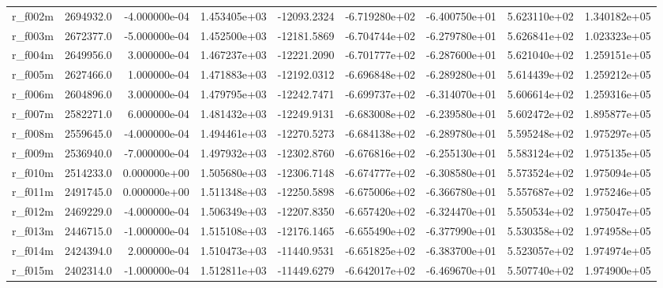 \documentclass[12pt]{article}
\begin{document}
\begin{landscape}
\begin{longtable}{|l|r|r|r|r|r|r|r|r|}
r\_f002m                 &  2694932.0 & -4.000000e-04 &  1.453405e+03 & -12093.2324 & -6.719280e+02 & -6.400750e+01 &  5.623110e+02 &  1.340182e+05 \\
r\_f003m                 &  2672377.0 & -5.000000e-04 &  1.452500e+03 & -12181.5869 & -6.704744e+02 & -6.279780e+01 &  5.626841e+02 &  1.023323e+05 \\
r\_f004m                 &  2649956.0 &  3.000000e-04 &  1.467237e+03 & -12221.2090 & -6.701777e+02 & -6.287600e+01 &  5.621040e+02 &  1.259151e+05 \\
r\_f005m                 &  2627466.0 &  1.000000e-04 &  1.471883e+03 & -12192.0312 & -6.696848e+02 & -6.289280e+01 &  5.614439e+02 &  1.259212e+05 \\
r\_f006m                 &  2604896.0 &  3.000000e-04 &  1.479795e+03 & -12242.7471 & -6.699737e+02 & -6.314070e+01 &  5.606614e+02 &  1.259316e+05 \\
r\_f007m                 &  2582271.0 &  6.000000e-04 &  1.481432e+03 & -12249.9131 & -6.683008e+02 & -6.239580e+01 &  5.602472e+02 &  1.895877e+05 \\
r\_f008m                 &  2559645.0 & -4.000000e-04 &  1.494461e+03 & -12270.5273 & -6.684138e+02 & -6.289780e+01 &  5.595248e+02 &  1.975297e+05 \\
r\_f009m                 &  2536940.0 & -7.000000e-04 &  1.497932e+03 & -12302.8760 & -6.676816e+02 & -6.255130e+01 &  5.583124e+02 &  1.975135e+05 \\
r\_f010m                 &  2514233.0 &  0.000000e+00 &  1.505680e+03 & -12306.7148 & -6.674777e+02 & -6.308580e+01 &  5.573524e+02 &  1.975094e+05 \\
r\_f011m                 &  2491745.0 &  0.000000e+00 &  1.511348e+03 & -12250.5898 & -6.675006e+02 & -6.366780e+01 &  5.557687e+02 &  1.975246e+05 \\
r\_f012m                 &  2469229.0 & -4.000000e-04 &  1.506349e+03 & -12207.8350 & -6.657420e+02 & -6.324470e+01 &  5.550534e+02 &  1.975047e+05 \\
r\_f013m                 &  2446715.0 & -1.000000e-04 &  1.515108e+03 & -12176.1465 & -6.655490e+02 & -6.377990e+01 &  5.530358e+02 &  1.974958e+05 \\
r\_f014m                 &  2424394.0 &  2.000000e-04 &  1.510473e+03 & -11440.9531 & -6.651825e+02 & -6.383700e+01 &  5.523057e+02 &  1.974974e+05 \\
r\_f015m                 &  2402314.0 & -1.000000e-04 &  1.512811e+03 & -11449.6279 & -6.642017e+02 & -6.469670e+01 &  5.507740e+02 &  1.974900e+05 \\

\end{longtable}
\end{landscape}
\end{document}
